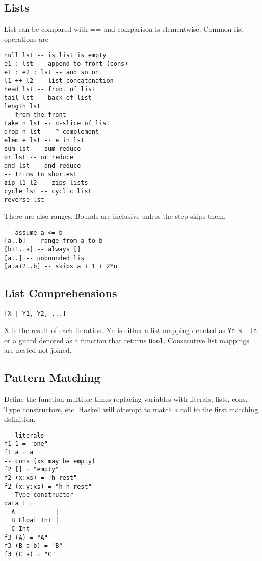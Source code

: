 \subsection*{Lists}
List can be compared with == and comparison is elementwise. Common list
operations are
\begin{verbatim}
null lst -- is list is empty
e1 : lst -- append to front (cons)
e1 : e2 : lst -- and so on
l1 ++ l2 -- list concatenation
head lst -- front of list
tail lst -- back of list
length lst
-- from the front
take n lst -- n-slice of list
drop n lst -- ^ complement
elem e lst -- e in lst
sum lst -- sum reduce
or lst -- or reduce
and lst -- and reduce
-- trims to shortest
zip l1 l2 -- zips lists
cycle lst -- cyclic list
reverse lst
\end{verbatim}
There are also ranges. Bounds are inclusive unless the step skips them.
\begin{verbatim}
-- assume a <= b
[a..b] -- range from a to b
[b+1..a] -- always []
[a..] -- unbounded list
[a,a+2..b] -- skips a + 1 + 2*n
\end{verbatim}

\subsection*{List Comprehensions}
\begin{verbatim}
[X | Y1, Y2, ...]
\end{verbatim}
X is the result of each iteration. Yn is either a list mapping denoted
as \lstinline|Yn <- ln| or a guard denoted as a function that returns
\lstinline|Bool|. Consecutive list mappings are nested not joined.

\subsection*{Pattern Matching}
Define the function multiple times replacing variables with literals,
lists, cons, Type constructors, etc. Haskell will attempt to match a
call to the first matching definition.
\begin{verbatim}
-- literals
f1 1 = "one"
f1 a = a
-- cons (xs may be empty)
f2 [] = "empty"
f2 (x:xs) = "h rest"
f2 (x:y:xs) = "h h rest"
-- Type constructor
data T = 
  A           |
  B Float Int |
  C Int
f3 (A) = "A"
f3 (B a b) = "B"
f3 (C a) = "C"
\end{verbatim}

